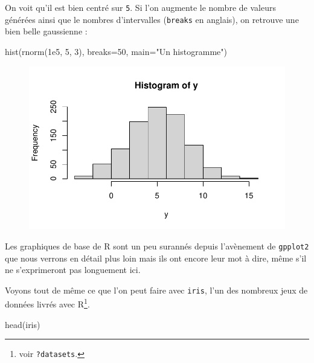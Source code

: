 \documentclass[
  letterpaper,
  DIV=11,
  numbers=noendperiod]{scrreprt}
\newenvironment{Shaded}{\begin{snugshade}}{\end{snugshade}}
\newcommand{\AttributeTok}[1]{\textcolor[rgb]{0.40,0.45,0.13}{#1}}
\newcommand{\DecValTok}[1]{\textcolor[rgb]{0.68,0.00,0.00}{#1}}
\newcommand{\FloatTok}[1]{\textcolor[rgb]{0.68,0.00,0.00}{#1}}
\newcommand{\FunctionTok}[1]{\textcolor[rgb]{0.28,0.35,0.67}{#1}}
\newcommand{\NormalTok}[1]{\textcolor[rgb]{0.00,0.23,0.31}{#1}}
\newcommand{\StringTok}[1]{\textcolor[rgb]{0.13,0.47,0.30}{#1}}
\begin{document}
On voit qu'il est bien centré sur \texttt{5}. Si l'on augmente le nombre
de valeurs générées ainsi que le nombres d'intervalles (\texttt{breaks}
en anglais), on retrouve une bien belle gaussienne :

\begin{Shaded}
\begin{Highlighting}[]
\FunctionTok{hist}\NormalTok{(}\FunctionTok{rnorm}\NormalTok{(}\FloatTok{1e5}\NormalTok{, }\DecValTok{5}\NormalTok{, }\DecValTok{3}\NormalTok{), }\AttributeTok{breaks=}\DecValTok{50}\NormalTok{, }\AttributeTok{main=}\StringTok{"Un histogramme"}\NormalTok{)}
\end{Highlighting}
\end{Shaded}

\begin{figure}[H]

{\centering \includegraphics{premiers-pas_files/figure-pdf/unnamed-chunk-61-1.pdf}

}

\end{figure}

Les graphiques de base de R sont un peu surannés depuis l'avènement de
\texttt{gpplot2} que nous verrons en détail plus loin mais ils ont
encore leur mot à dire, même s'il ne s'exprimeront pas longuement ici.

Voyons tout de même ce que l'on peut faire avec \texttt{iris}, l'un des
nombreux jeux de données livrés avec R\footnote{voir \texttt{?datasets}.}.

\begin{Shaded}
\begin{Highlighting}[]
\FunctionTok{head}\NormalTok{(iris)}
\end{Highlighting}
\end{Shaded}
\end{document}
